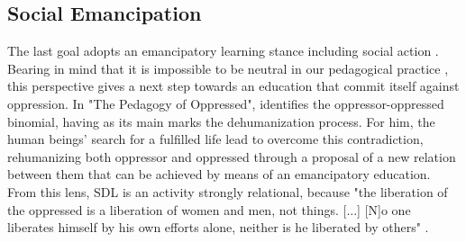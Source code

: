                 

        

        

\subsection{Social Emancipation}
\label{sdl-goal-ss:emanc}

The last goal adopts an emancipatory learning stance including social action \cite{tissenbaum:2019}. Bearing in mind that it is impossible to be neutral in our pedagogical practice \cite{bispojr:2022-educomp}, this perspective gives a next step towards an education that commit itself against oppression. In "The Pedagogy of Oppressed",  identifies the oppressor-oppressed binomial, having as its main marks the dehumanization process. For him, the human beings' search for a fulfilled life lead to overcome this contradiction, rehumanizing both oppressor and oppressed through a proposal of a new relation between them that can be achieved by means of an emancipatory education. From this lens, \gls{SDL} is an activity strongly relational, because "the liberation of the oppressed is a liberation of women and men, not things. [...] [N]o one liberates himself by his own efforts alone, neither is he liberated by others" \cite[p.~66]{freire:2000-oppressed}.

